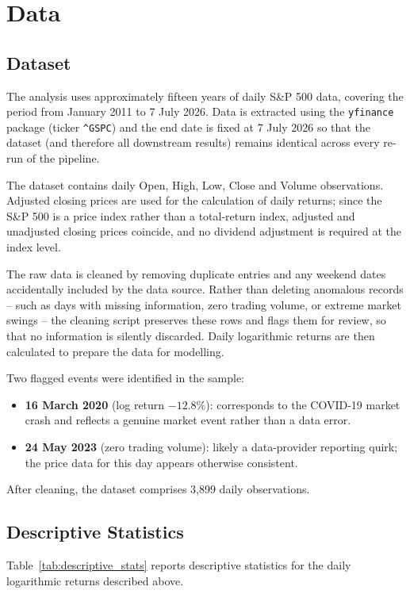 \documentclass[12pt,a4paper]{article}
\begin{document}
\section{Data}
\subsection{Dataset}
The analysis uses approximately fifteen years of daily S\&P 500 data, covering the period from
January 2011 to 7 July 2026. Data is extracted using the \texttt{yfinance} package (ticker
\texttt{\^{}GSPC}) and the end date is fixed at 7 July 2026 so that the dataset (and therefore all
downstream results) remains identical across every re-run of the pipeline.

The dataset contains daily Open, High, Low, Close and Volume observations. Adjusted closing prices
are used for the calculation of daily returns; since the S\&P 500 is a price index rather than a
total-return index, adjusted and unadjusted closing prices coincide, and no dividend adjustment is
required at the index level.

The raw data is cleaned by removing duplicate entries and any weekend dates accidentally included
by the data source. Rather than deleting anomalous records -- such as days with missing information,
zero trading volume, or extreme market swings -- the cleaning script preserves these rows and flags
them for review, so that no information is silently discarded. Daily logarithmic returns are then
calculated to prepare the data for modelling.

Two flagged events were identified in the sample:

\begin{itemize}
    \item \textbf{16 March 2020} (log return $-12.8\%$): corresponds to the COVID-19 market crash
    and reflects a genuine market event rather than a data error.
    \item \textbf{24 May 2023} (zero trading volume): likely a data-provider reporting quirk; the
    price data for this day appears otherwise consistent.
\end{itemize}

After cleaning, the dataset comprises 3,899 daily observations.
\subsection{Descriptive Statistics}\label{sec:descriptive_stats}
Table~\ref{tab:descriptive_stats} reports descriptive statistics for the daily logarithmic
returns described above.
\end{document}
